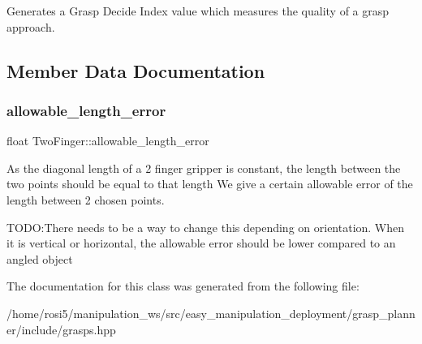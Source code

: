 Generates a Grasp Decide Index value which measures the quality of a grasp approach. 

\subsection{Member Data Documentation}
\mbox{\label{classTwoFinger_a180e995cc0516a1664f88e9067ff0ae0}} 
\subsubsection{\texorpdfstring{allowable\+\_\+length\+\_\+error}{allowable\_length\_error}}
{\footnotesize\ttfamily float Two\+Finger\+::allowable\+\_\+length\+\_\+error}



As the diagonal length of a 2 finger gripper is constant, the length between the two points should be equal to that length We give a certain allowable error of the length between 2 chosen points. 

T\+O\+DO\+:There needs to be a way to change this depending on orientation. When it is vertical or horizontal, the allowable error should be lower compared to an angled object 

The documentation for this class was generated from the following file\+:\begin{DoxyCompactItemize}
\item 
/home/rosi5/manipulation\+\_\+ws/src/easy\+\_\+manipulation\+\_\+deployment/grasp\+\_\+planner/include/grasps.\+hpp\end{DoxyCompactItemize}
